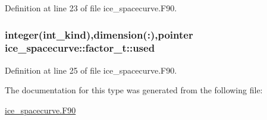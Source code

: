 Definition at line 23 of file ice\_\-spacecurve.F90.\hypertarget{typeice__spacecurve_1_1factor__t_aa5d5260055cdf1791e45b0f7702ef828}{
\subsubsection[{used}]{\setlength{\rightskip}{0pt plus 5cm}integer(int\_\-kind),dimension(:),pointer {\bf ice\_\-spacecurve::factor\_\-t::used}}}
\label{typeice__spacecurve_1_1factor__t_aa5d5260055cdf1791e45b0f7702ef828}


Definition at line 25 of file ice\_\-spacecurve.F90.

The documentation for this type was generated from the following file:\begin{DoxyCompactItemize}
\item 
\hyperlink{ice__spacecurve_8F90}{ice\_\-spacecurve.F90}\end{DoxyCompactItemize}
